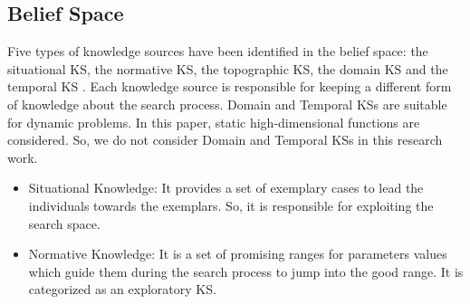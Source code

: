\documentclass{llncs}
\begin{document}
\subsection{Belief Space}
Five types of knowledge sources have been identified in the belief space: the situational KS, the normative KS, the topographic KS, the domain KS and the temporal KS \cite{king2008embedding}. Each knowledge source is responsible for keeping a different form of knowledge about the search process. Domain and Temporal KSs are suitable for dynamic problems. In this paper, static high-dimensional functions are considered. So, we do not consider Domain and Temporal KSs in this research work\cite{ali2016leveraged}.  
\begin{itemize}
	\item Situational Knowledge: It provides a set of exemplary cases to lead the individuals towards the exemplars. So, it is responsible for exploiting the search space. %
	
	\item Normative Knowledge: It is a set of promising ranges for parameters values which guide them during the search process to jump into the good range. It is categorized as an exploratory KS. %


\end{itemize}
\end{document}
